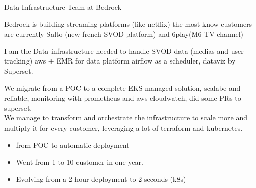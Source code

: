 \documentclass[10pt,a4paper,ragged2e,withhyper]{altacv}
\begin{document}



\begin{paracol}{2}



\parskip=12pt %

Data Infrastructure Team at Bedrock


Bedrock is building streaming platforms (like netflix) the most know customers are currently Salto (new french SVOD platform) and 6play(M6 TV channel)


I am the Data infrastructure needed to handle SVOD data (medias and user tracking)
aws +  EMR for data platform airflow as a scheduler, dataviz by Superset.


We migrate from a POC to a complete EKS managed solution, scalabe and reliable, monitoring  with prometheus and aws cloudwatch, did some PRs to superset.\\

We manage to transform and orchestrate the infrastructure to scale more and multiply it for every customer, leveraging a lot of terraform and kubernetes.\\
\begin{itemize}
\item from POC to automatic deployment
\item Went from 1 to 10 customer in one year.
\item Evolving from a 2 hour deployment to 2 seconds (k8s)
\end{itemize}


\divider






\end{paracol}
\end{document}
